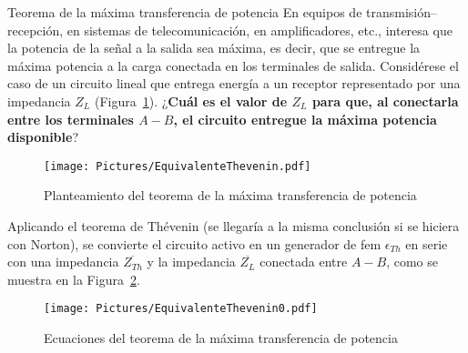 \documentclass[11pt]{book} %
\makeatletter
\numberwithin{dummy}{section}
\theoremstyle{ocrenumbox}
\theoremstyle{blacknumex}
\theoremstyle{blacknumbox}
\theoremstyle{ocrenum}
\renewcommand{\section}{\@startsection{section}{1}{\z@}
{-4ex \@plus -1ex \@minus -.4ex}
{1ex \@plus.2ex }
{\normalfont\large\sffamily\bfseries}}
\makeatother
\begin{document}
\section{Teorema de la máxima transferencia de potencia}
En equipos de transmisión--recepción, en sistemas de telecomunicación, en amplificadores, etc., interesa que la potencia de la señal a la salida sea máxima, es decir, que se entregue la máxima potencia a la carga conectada en los terminales de salida. Considérese el caso de un circuito lineal que entrega energía a un receptor representado por una impedancia $Z_L$ (Figura~\ref{fig.planteamiento_mtp}). ¿\textbf{Cuál es el valor de $Z_L$ para que, al conectarla entre los terminales $A-B$, el circuito entregue la máxima potencia disponible}?
\begin{figure}[htbp]
    \centering
    \texttt{[image: Pictures/EquivalenteThevenin.pdf]}
    \caption{Planteamiento del teorema de la máxima transferencia de potencia}
    \label{fig.planteamiento_mtp}
\end{figure}

Aplicando el teorema de Thévenin (se llegaría a la misma conclusión si se hiciera con Norton), se convierte el circuito activo en un generador de fem $\epsilon_{Th}$ en serie con una impedancia $\overline{Z_{Th}}$ y la impedancia $\overline{Z_L}$ conectada entre $A-B$, como se muestra en la Figura~\ref{fig.equivalenteThevenin0}. 
\begin{figure}[htbp]
    \centering
    \texttt{[image: Pictures/EquivalenteThevenin0.pdf]}
    \caption{Ecuaciones del teorema de la máxima transferencia de potencia}
    \label{fig.equivalenteThevenin0}
\end{figure}
\end{document}
